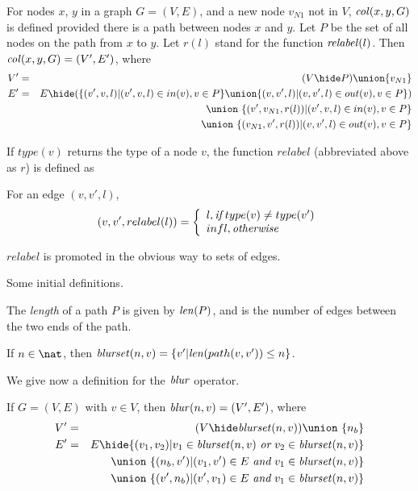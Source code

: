 \documentclass{elsarticle}
\begin{document}
\begin{definition}[$\col$]  \label{def:col}
  For nodes $x$, $y$ in a graph $G = (V,E)$, and a new node $v_{N1}$ not in $V$,  $\mathit{col}(x,y,G)$ is defined provided there is a path between nodes $x$ and $y$. Let $P$ be the set of all nodes on the path from $x$ to $y$. Let $r(l)$ stand for the function $\mathit{relabel}(l)$. Then $\mathit{col}(x,y,G) =  (V',E')$, where 
  \begin{eqnarray*}
  V' & = & (V\hide P) \union \{v_{N1}\}     \\
  E' & = & E\hide (
                   \{(v',v,l)|(v',v,l) \in in(v), v\in P\}
                   \union
                   \{(v,v',l)|(v,v',l) \in out(v), v\in P\}
                  )\\
  && \union\ \{(v',v_{N1},r(l))|(v',v,l) \in in(v), v\in P\}\\
  && \union\ \{(v_{N1},v',r(l))|(v,v',l) \in out(v), v\in P\}\\
  \end{eqnarray*}
\end{definition}
If $type(v)$ returns the type of a node $v$, the function $relabel$ (abbreviated above as $r$) is defined as 
\begin{definition}[$relabel$] \label{def:relabel}
  For an edge $(v,v',l)$, 
  \[
   (v,v',relabel(l)) = \left\{
   \begin{array}{l}
      l,    {\emph{if}}\; type(v) \neq type(v') \\
      infl, \emph{otherwise}
   \end{array}   \right.
  \]
\end{definition}
\noindent
$relabel$ is promoted in the obvious way to sets of edges.


Some initial definitions.

The \emph{length} of a path $P$ is given by $\mathit{len}(P)$, and is the number of edges between the two ends of the path.

If $n \in \nat$, then $\mathit{blurset}(n,v) = \{v'|\mathit{len}(path(v,v')) \leq n\}$.

We give now a definition for the $\blur$ operator.

\begin{definition}[$\blur$] \label{def:blur}
  If $G = (V,E)$ with $v \in V$, then $\mathit{blur}(n,v) = (V',E')$, where
  \begin{eqnarray*}
  V' &=& (V\hide \blurset(n,v)) \union\ \{n_b\}\\
  E' &=& E\hide \{(v_1,v_2)| v_1 \in \blurset(n,v) ~\emph{or}~ v_2 \in \blurset(n,v)\}\\
  &&\union\ \{(n_b,v')|(v_1,v') \in E ~\emph{and}~ v_1 \in \blurset(n,v)\} \\
  &&\union\ \{(v',n_b)|(v',v_1) \in E ~\emph{and}~ v_1 \in \blurset(n,v)\} \\
  \end{eqnarray*}
\end{definition}
\end{document}
